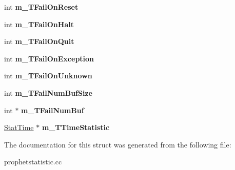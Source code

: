 \begin{DoxyCompactItemize}
\item 
\hypertarget{structProphetStat_1_1tstat_a6ee4ecbf9f7a400d705d59c2d1711b28}{
int {\bfseries m\_\-TFailOnReset}}
\label{structProphetStat_1_1tstat_a6ee4ecbf9f7a400d705d59c2d1711b28}

\item 
\hypertarget{structProphetStat_1_1tstat_a4fba404748848028775fbd8482ea12a8}{
int {\bfseries m\_\-TFailOnHalt}}
\label{structProphetStat_1_1tstat_a4fba404748848028775fbd8482ea12a8}

\item 
\hypertarget{structProphetStat_1_1tstat_aa21aa86ea165d5bf9bb8524309454e72}{
int {\bfseries m\_\-TFailOnQuit}}
\label{structProphetStat_1_1tstat_aa21aa86ea165d5bf9bb8524309454e72}

\item 
\hypertarget{structProphetStat_1_1tstat_a4428443bb94cd1e1a6c24bc432ca0c21}{
int {\bfseries m\_\-TFailOnException}}
\label{structProphetStat_1_1tstat_a4428443bb94cd1e1a6c24bc432ca0c21}

\item 
\hypertarget{structProphetStat_1_1tstat_a7a30646b7b82d1cc4fa96721462f59ac}{
int {\bfseries m\_\-TFailOnUnknown}}
\label{structProphetStat_1_1tstat_a7a30646b7b82d1cc4fa96721462f59ac}

\item 
\hypertarget{structProphetStat_1_1tstat_a482f4a0b515c775e686822135aaa8378}{
int {\bfseries m\_\-TFailNumBufSize}}
\label{structProphetStat_1_1tstat_a482f4a0b515c775e686822135aaa8378}

\item 
\hypertarget{structProphetStat_1_1tstat_a8ada08b132a362f766a3f2ffe415d3bb}{
int $\ast$ {\bfseries m\_\-TFailNumBuf}}
\label{structProphetStat_1_1tstat_a8ada08b132a362f766a3f2ffe415d3bb}

\item 
\hypertarget{structProphetStat_1_1tstat_a77258d5c47e37842c529765e93392c45}{
\hyperlink{structProphetStat_1_1StatTime}{StatTime} $\ast$ {\bfseries m\_\-TTimeStatistic}}
\label{structProphetStat_1_1tstat_a77258d5c47e37842c529765e93392c45}

\end{DoxyCompactItemize}


The documentation for this struct was generated from the following file:\begin{DoxyCompactItemize}
\item 
prophetstatistic.cc\end{DoxyCompactItemize}
